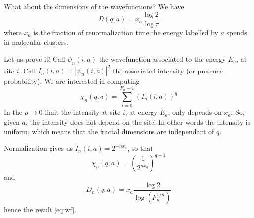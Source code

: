\documentclass[11pt]{article}
\begin{document}
What about the dimensions of the wavefunctions?
We have
\begin{equation}
\label{eq:wf}
	D(q;a) = x_a \frac{\log 2}{\log \tau}
\end{equation}
where $x_a$ is the fraction of renormalization time the energy labelled by $a$ spends in molecular clusters.

Let us prove it!
Call $\psi_n(i,a)$ the wavefunction associated to the energy $E_a$, at site $i$. Call $I_n(i,a) = |\psi_n(i,a)|^2$ the associated intensity (or presence probability).
We are interested in computing
\begin{equation}
	\chi_n(q;a) = \sum_{i=0}^{F_n - 1} (I_n(i,a))^q
\end{equation}
In the $\rho \rightarrow 0$ limit the intensity at site $i$, at energy $E_a$, only depends on $x_a$. So, given $a$, the intensity does not depend on the site! In other words the intensity is uniform, which means that the fractal dimensions are independant of $q$.

Normalization gives us $I_n(i,a) = 2^{-nx_a}$, so that
\begin{equation}
	\chi_n(q;a) = \left( \frac{1}{2^{n x_a}} \right)^{q-1}
\end{equation}
and
\begin{equation}
	D_n(q;a) = x_a \frac{\log 2}{\log( F_n^{1/n} )}
\end{equation}
hence the result \eqref{eq:wf}.
\end{document}
